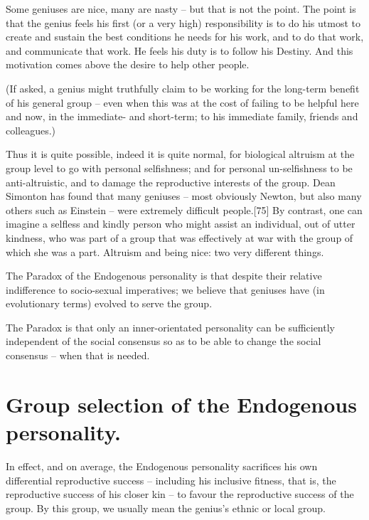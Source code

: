 \documentclass[
]{book}
\begin{document}
Some geniuses are nice, many are nasty -- but that is not the point. The point is that the genius feels his first (or a very high) responsibility is to do his utmost to create and sustain the best conditions he needs for his work, and to do that work, and communicate that work. He feels his duty is to follow his Destiny. And this motivation comes above the desire to help other people.

(If asked, a genius might truthfully claim to be working for the long-term benefit of his general group -- even when this was at the cost of failing to be helpful here and now, in the immediate- and short-term; to his immediate family, friends and colleagues.)

Thus it is quite possible, indeed it is quite normal, for biological altruism at the group level to go with personal selfishness; and for personal un-selfishness to be anti-altruistic, and to damage the reproductive interests of the group. Dean Simonton has found that many geniuses -- most obviously Newton, but also many others such as Einstein -- were extremely difficult people.{[}75{]} By contrast, one can imagine a selfless and kindly person who might assist an individual, out of utter kindness, who was part of a group that was effectively at war with the group of which she was a part. Altruism and being nice: two very different things.

The Paradox of the Endogenous personality is that despite their relative indifference to socio-sexual imperatives; we believe that geniuses have (in evolutionary terms) evolved to serve the group.

The Paradox is that only an inner-orientated personality can be sufficiently independent of the social consensus so as to be able to change the social consensus -- when that is needed.

\hypertarget{group-selection-of-the-endogenous-personality.}{%
\section{Group selection of the Endogenous personality.}\label{group-selection-of-the-endogenous-personality.}}

In effect, and on average, the Endogenous personality sacrifices his own differential reproductive success -- including his inclusive fitness, that is, the reproductive success of his closer kin -- to favour the reproductive success of the group. By this group, we usually mean the genius's ethnic or local group.
\end{document}
